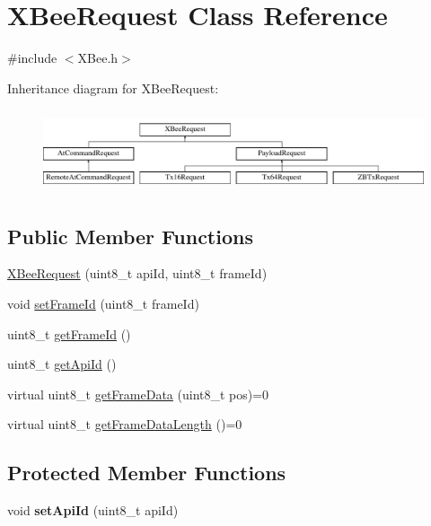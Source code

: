 \hypertarget{classXBeeRequest}{\section{\-X\-Bee\-Request \-Class \-Reference}
\label{classXBeeRequest}
}


{\ttfamily \#include $<$\-X\-Bee.\-h$>$}

\-Inheritance diagram for \-X\-Bee\-Request\-:\begin{figure}[H]
\begin{center}
\leavevmode
\includegraphics[height=2.441860cm]{classXBeeRequest}
\end{center}
\end{figure}
\subsection*{\-Public \-Member \-Functions}
\begin{DoxyCompactItemize}
\item 
\hyperlink{classXBeeRequest_af80fd559cab746ab8573087cddda71a2}{\-X\-Bee\-Request} (uint8\-\_\-t api\-Id, uint8\-\_\-t frame\-Id)
\item 
void \hyperlink{classXBeeRequest_aed1724c11e710217807c971e40105c86}{set\-Frame\-Id} (uint8\-\_\-t frame\-Id)
\item 
uint8\-\_\-t \hyperlink{classXBeeRequest_a20394c7ea4666224c50bef25cc0cd836}{get\-Frame\-Id} ()
\item 
uint8\-\_\-t \hyperlink{classXBeeRequest_a746d0373c9fb6ed0ff8b7e04f5fb12c9}{get\-Api\-Id} ()
\item 
virtual uint8\-\_\-t \hyperlink{classXBeeRequest_ad5b998cd95a570bdaa4d74c6c8790d94}{get\-Frame\-Data} (uint8\-\_\-t pos)=0
\item 
virtual uint8\-\_\-t \hyperlink{classXBeeRequest_a03b6c558db5836fa7167c0fba7405642}{get\-Frame\-Data\-Length} ()=0
\end{DoxyCompactItemize}
\subsection*{\-Protected \-Member \-Functions}
\begin{DoxyCompactItemize}
\item 
\hypertarget{classXBeeRequest_aee756672e79dbb05358187cb53f61b1a}{void {\bfseries set\-Api\-Id} (uint8\-\_\-t api\-Id)}\label{classXBeeRequest_aee756672e79dbb05358187cb53f61b1a}

\end{DoxyCompactItemize}


